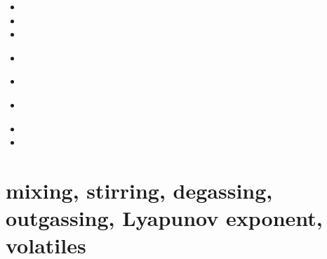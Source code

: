 \begin{small}
\begin{itemize}
\item[\nineteeneightyseven]
\item[\twothousandeight]
\item[\twothousandseventeen]
\item[\twothousandeighteen]
 \\ 
\item[\twothousandtwenty]
\item[\twothousandtwentythree]
 \\
\item[\twothousandtwentyfive]
\item[\twothousandtwentysix]
\end{itemize}
\end{small}





\section{mixing, stirring, degassing, outgassing, Lyapunov exponent, volatiles } 


